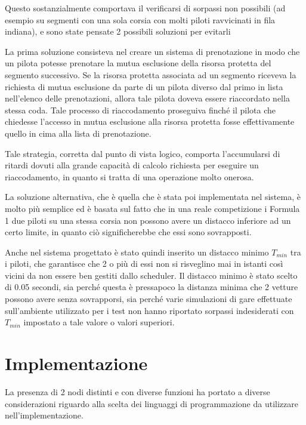 \documentclass[a4paper,11pt, twoside, openright]{book}
\begin{document}
      Questo sostanzialmente comportava il verificarsi di sorpassi non possibili (ad esempio su segmenti con una sola
      corsia con molti piloti ravvicinati in fila indiana), e sono state pensate 2 possibili soluzioni per evitarli
      
      La prima soluzione consisteva nel creare un sistema di prenotazione in modo che un pilota potesse prenotare
      la mutua esclusione della risorsa protetta del segmento successivo. 
      Se la risorsa protetta associata ad un segmento riceveva la richiesta
      di mutua esclusione da parte di un pilota diverso dal primo in lista nell'elenco delle prenotazioni, allora tale pilota
      doveva essere riaccordato nella stessa coda. Tale processo di riaccodamento proseguiva finché il pilota
      che chiedesse l'accesso in mutua esclusione alla risorsa protetta fosse effettivamente quello in cima alla lista
      di prenotazione.
      
      Tale strategia, corretta dal punto di vista logico, comporta l'accumularsi di ritardi dovuti alla grande capacità
      di calcolo richiesta per eseguire un riaccodamento, in quanto si tratta di una operazione molto onerosa.
      
      La soluzione alternativa, che è quella che è stata poi implementata nel sistema, è molto più semplice
      ed è basata sul fatto che in una reale competizione i Formula 1 due piloti su una stessa corsia
      non possono avere un distacco inferiore ad un certo limite, in quanto ciò significherebbe che essi sono sovrapposti.
      
      Anche nel sistema progettato è stato quindi inserito un distacco minimo $T_{min}$ tra i piloti, che garantisce 
      che 2 o più di essi non si risveglino mai in istanti così vicini da non essere ben gestiti 
      dallo scheduler. Il distacco minimo è stato scelto di 0.05 secondi, sia perché questa è pressapoco la distanza
      minima che 2 vetture possono avere senza sovrapporsi, sia perché varie simulazioni di gare
      effettuate sull'ambiente utilizzato per i test non hanno riportato sorpassi indesiderati con $T_{min}$
      impostato a tale valore o valori superiori.
	  
  \chapter{Implementazione}
    La presenza di 2 nodi distinti e con diverse funzioni ha portato a diverse considerazioni riguardo alla
    scelta dei linguaggi di programmazione da utilizzare nell'implementazione.
    
\end{document}
